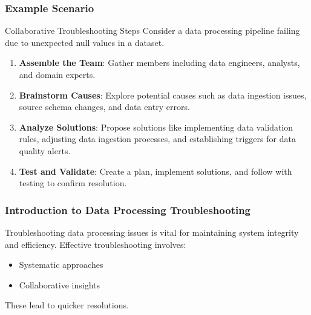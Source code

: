 \documentclass[aspectratio=169]{beamer}
\begin{document}
\begin{frame}[fragile]
    \frametitle{Example Scenario}
    \begin{block}{Collaborative Troubleshooting Steps}
        Consider a data processing pipeline failing due to unexpected null values in a dataset.  
        \begin{enumerate}
            \item \textbf{Assemble the Team}: Gather members including data engineers, analysts, and domain experts.
            \item \textbf{Brainstorm Causes}: Explore potential causes such as data ingestion issues, source schema changes, and data entry errors.
            \item \textbf{Analyze Solutions}: Propose solutions like implementing data validation rules, adjusting data ingestion processes, and establishing triggers for data quality alerts.
            \item \textbf{Test and Validate}: Create a plan, implement solutions, and follow with testing to confirm resolution.
        \end{enumerate}
    \end{block}
\end{frame}

\begin{frame}[fragile]
    \frametitle{Introduction to Data Processing Troubleshooting}
    Troubleshooting data processing issues is vital for maintaining system integrity and efficiency. 
    Effective troubleshooting involves:
    \begin{itemize}
        \item Systematic approaches
        \item Collaborative insights
    \end{itemize}
    These lead to quicker resolutions.
\end{frame}
\end{document}
